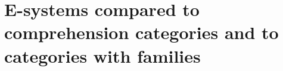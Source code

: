 \begin{comment}
In the following definition $\Delta(X)$ denotes the discrete category on the set
$X$ and $\mathbf{2}$ is the category $s\to t$.
\begin{defn}
Define $\mathbb{S}$ to be the pushout
\begin{equation*}
\begin{tikzcd}[column sep=large]
\Delta(\mathbb{N}) \arrow[r,"{n\mapsto(n,s)}"] \arrow[d,swap,"i"] & \Delta(\mathbb{N})\times\mathbf{2} \arrow[d] \\
(\mathbb{N},\leq) \arrow[r] & \mathbb{S}
\end{tikzcd}
\end{equation*}
in $\mathbf{Cat}$.
\end{defn}

Note that for any $n\in\mathbb{N}$, we have the map $S^n := (m\mapsto m+n)$ which
is monotone. By the universal property of pushouts, we obtain a functor $\sigma^n:\mathbb{S}\to\mathbb{S}$
given by
\begin{equation*}
\begin{tikzcd}[column sep=huge]
\Delta(\mathbb{N}) 
  \arrow[r,"{n\mapsto(n,s)}"] 
  \arrow[d,swap,"i"] 
  & 
\Delta(\mathbb{N})\times\mathbf{2} 
  \arrow[d]
  \arrow[r,"{\Delta(S^n)\times\catid{\mathbf{2}}}"]
  &
\Delta(\mathbb{N})\times\mathbf{2}
  \arrow[dd]
  \\
(\mathbb{N},\leq) 
  \arrow[r] 
  \arrow[d,swap,"{(S^n,\leq)}"]
  & 
\mathbb{S}
  \arrow[dr,densely dotted,yshift=.5ex,"\sigma^n"]
  \\
(\mathbb{N},\leq)
  \arrow[rr] & &
\mathbb{S}
\end{tikzcd}
\end{equation*}

\begin{defn}
A non-unital pre-B0-system is a presheaf $B$ on $\mathbb{S}$ such that $B(0)$ is
a singleton, and the following additional structure:
\begin{enumerate}
\item For any $n\in\mathbb{N}$ and $X\in B(n)$, write $B/X$ for the sub-presheaf
of $B\circ\sigma^n$ given by $B/X(0)=\{X\}$ and $B/X(n+1)=B_{n\leq n+1}^{-1}(B/X(n))$. 
We require that for any $n\in\mathbb{N}$ and any $A\in B(n+1)$, there is a 
natural transformation $W_A:B/(B_{n\leq n+1}(A))\Rightarrow B/A$.
\end{enumerate}
\end{defn}
\end{comment}

\section{E-systems compared to comprehension categories and to categories with families}
